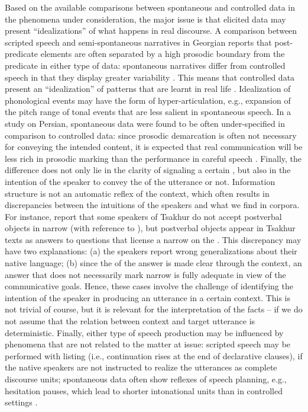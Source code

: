 \documentclass[output=paper,colorlinks,citecolor=brown]{langscibook}
\begin{document}
Based on the available comparisons between spontaneous and controlled data in the phenomena under consideration, the major issue is that elicited data may present ``idealizations'' of what happens in real discourse. A comparison between scripted speech and semi-spontaneous narratives in Georgian reports that post-predicate elements are often separated by a high prosodic boundary from the predicate in either type of data: spontaneous narratives differ from controlled speech in that they display greater variability \citep[44]{Skopeteasetal_Information_2018}. This means that controlled data present an ``idealization'' of patterns that are learnt in real life \citep{stokhof_abstractions_2011}. Idealization of phonological events may have the form of hyper-articulation, e.g., expansion of the pitch range of tonal events that are less salient in spontaneous speech. In a study on Persian, spontaneous data were found to be often under-specified in comparison to controlled data: since prosodic demarcation is often not necessary for conveying the intended content, it is expected that real communication will be less rich in prosodic marking than the performance in careful speech \citep[28--31]{sadat-tehrani_intonation_2017}. Finally, the difference does not only lie in the clarity of signaling a certain , but also in the intention of the speaker to convey the  of the utterance or not. Information structure is not an automatic reflex of the context, which often results in discrepancies between the intuitions of the speakers and what we find in corpora. For instance, \citet[243]{forker_word_2016} report that some speakers of Tsakhur do not accept postverbal objects in narrow  (with reference to \citealt[]{testelec_porjadok_1999}), but postverbal objects appear in Tsakhur texts as answers to questions that license a narrow  on the . This discrepancy may have two explanations: (a) the speakers report wrong generalizations about their native language; (b) since the  of the answer is made clear through the context, an answer that does not necessarily mark narrow  is fully adequate in view of the communicative goals. Hence, these cases involve the challenge of identifying the intention of the speaker in producing an utterance in a certain context. This is not trivial of course, but it is relevant for the interpretation of the facts -- if we do not assume that the relation between context and target utterance is deterministic. Finally, either type of speech production may be influenced by phenomena that are not related to the matter at issue: scripted speech may be performed with listing  (i.e., continuation rises at the end of declarative clauses), if the native speakers are not instructed to realize the utterances as complete discourse units; spontaneous data often show reflexes of speech planning, e.g., hesitation pauses, which lead to shorter intonational units than in controlled settings \citep[31-33]{sadat-tehrani_intonation_2017}.
\end{document}
